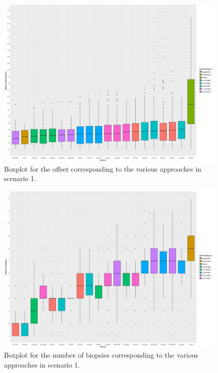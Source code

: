 \begin{figure}[H]
\centering
\captionsetup{justification=centering}
\includegraphics[width=\textwidth]{sim_study_res_sc_10_sh_7pt5/offset_boxplot.png}
\caption{\label{fig : sc_10_sh_7pt5_offset_boxplot} Boxplot for the offset corresponding to the various approaches in scenario 1.}
\end{figure}

\begin{figure}[H]
\centering
\captionsetup{justification=centering}
\includegraphics[width=\textwidth]{sim_study_res_sc_10_sh_7pt5/nb_boxplot.png}
\caption{\label{fig : sc_10_sh_7pt5_nb_boxplot} Boxplot for the number of biopsies corresponding to the various approaches in scenario 1.}
\end{figure}

